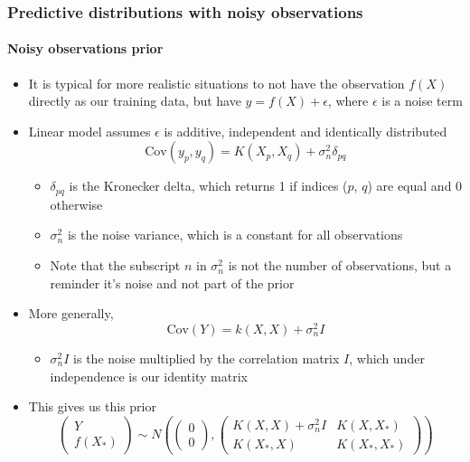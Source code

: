 \documentclass[12pt]{article}
\begin{document}
\subsubsection{Predictive distributions with noisy observations}

\paragraph{Noisy observations prior}
\begin{itemize}
    \item It is typical for more realistic situations to not have the observation $f(X)$ directly as our training data, but have $y = f(X) + \epsilon$, where $\epsilon$ is a noise term
    \item Linear model assumes $\epsilon$ is additive, independent and identically distributed
\begin{equation}
    \text{Cov}(y_p, y_q) = K(X_p, X_q) + \sigma^2_n\delta_{pq}
\end{equation}
    \begin{itemize}
        \item $\delta_{pq}$ is the Kronecker delta, which returns 1 if indices ($p$, $q$) are equal and 0 otherwise
        \item $\sigma^2_n$ is the noise variance, which is a constant for all observations
        \item Note that the subscript $n$ in $\sigma^2_n$ is not the number of observations, but a reminder it's noise and not part of the prior
    \end{itemize}
    \item More generally,
\begin{equation}
    \text{Cov}(Y) = k(X,X) + \sigma^2_nI
\end{equation}
    \begin{itemize}
        \item $\sigma^2_nI$ is the noise multiplied by the correlation matrix $I$, which under independence is our identity matrix
    \end{itemize}
    \item This gives us this prior
\begin{equation}
    \begin{pmatrix}
        Y \\ f(X_*)
    \end{pmatrix} \sim N\left(
    \begin{pmatrix}
        0 \\ 0
    \end{pmatrix},
    \begin{pmatrix}
        K(X,X) + \sigma^2_nI & K(X,X_*) \\ K(X_*,X) & K(X_*,X_*)
    \end{pmatrix}
    \right)
\end{equation}
\end{itemize}
\end{document}
